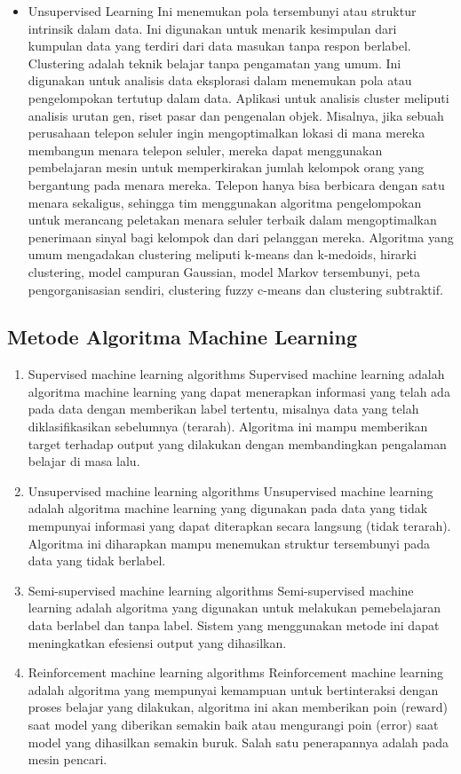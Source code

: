 \begin{itemize}
\item Unsupervised Learning
Ini menemukan pola tersembunyi atau struktur intrinsik dalam data. Ini digunakan untuk menarik kesimpulan dari kumpulan data yang terdiri dari data masukan tanpa respon berlabel. Clustering adalah teknik belajar tanpa pengamatan yang umum. Ini digunakan untuk analisis data eksplorasi dalam menemukan pola atau pengelompokan tertutup dalam data. Aplikasi untuk analisis cluster meliputi analisis urutan gen, riset pasar dan pengenalan objek.
Misalnya, jika sebuah perusahaan telepon seluler ingin mengoptimalkan lokasi di mana mereka membangun menara telepon seluler, mereka dapat menggunakan pembelajaran mesin untuk memperkirakan jumlah kelompok orang yang bergantung pada menara mereka. Telepon hanya bisa berbicara dengan satu menara sekaligus, sehingga tim menggunakan algoritma pengelompokan untuk merancang peletakan menara seluler terbaik dalam mengoptimalkan penerimaan sinyal bagi kelompok dan dari pelanggan mereka.
Algoritma yang umum mengadakan clustering meliputi k-means dan k-medoids, hirarki clustering, model campuran Gaussian, model Markov tersembunyi, peta pengorganisasian sendiri, clustering fuzzy c-means dan clustering subtraktif.
\end{itemize}
\subsection {Metode Algoritma Machine Learning} 
\begin{enumerate}
\item Supervised machine learning algorithms
Supervised machine learning adalah algoritma machine learning yang dapat menerapkan informasi yang telah ada pada data dengan memberikan label tertentu, misalnya data yang telah diklasifikasikan sebelumnya (terarah). Algoritma ini mampu memberikan target terhadap output yang dilakukan dengan membandingkan pengalaman belajar di masa lalu.
\item Unsupervised machine learning algorithms
Unsupervised machine learning adalah algoritma machine learning yang digunakan pada data yang tidak mempunyai informasi yang dapat diterapkan secara langsung (tidak terarah). Algoritma ini diharapkan mampu menemukan struktur tersembunyi pada data yang tidak berlabel.
\item Semi-supervised machine learning algorithms
Semi-supervised machine learning adalah algoritma yang digunakan untuk melakukan pemebelajaran data berlabel dan tanpa label. Sistem yang menggunakan metode ini dapat meningkatkan efesiensi output yang dihasilkan.
\item Reinforcement machine learning algorithms
Reinforcement machine learning adalah algoritma yang mempunyai kemampuan untuk bertinteraksi dengan proses belajar yang dilakukan, algoritma ini akan memberikan poin (reward) saat model yang diberikan semakin baik atau mengurangi poin (error) saat model yang dihasilkan semakin buruk. Salah satu penerapannya adalah pada mesin pencari.
\end{enumerate}
